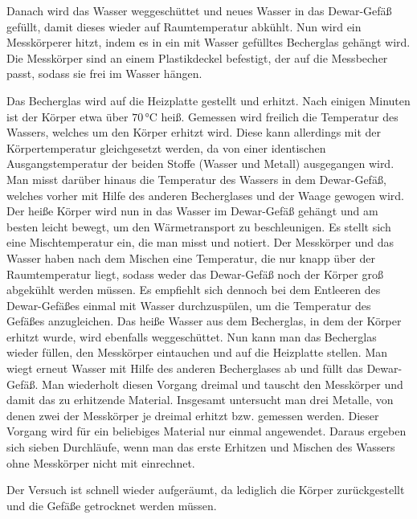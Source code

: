 Danach wird das Wasser weggeschüttet und neues Wasser in das Dewar-Gefäß gefüllt, damit dieses wieder auf Raumtemperatur abkühlt.
Nun wird ein Messkörperer hitzt, indem es in ein mit Wasser gefülltes Becherglas gehängt wird. Die Messkörper sind an einem Plastikdeckel befestigt, der auf %
die Messbecher passt, sodass sie frei im Wasser hängen.

Das Becherglas wird auf die Heizplatte gestellt und erhitzt. 
Nach einigen Minuten ist der Körper etwa über $70 \, \si{\celsius}$ heiß. %
Gemessen wird freilich die Temperatur des Wassers, welches um den Körper erhitzt wird. 
Diese kann allerdings mit der Körpertemperatur gleichgesetzt werden, da von einer identischen Ausgangstemperatur der beiden Stoffe (Wasser und Metall) ausgegangen wird. %
Man misst darüber hinaus die Temperatur des Wassers in dem Dewar-Gefäß, welches vorher mit Hilfe des anderen Becherglases und der Waage gewogen wird. %
Der heiße Körper wird nun in das Wasser im Dewar-Gefäß gehängt und am besten leicht bewegt, um den Wärmetransport zu beschleunigen.
Es stellt sich eine Mischtemperatur ein, die man misst und notiert. Der Messkörper und das Wasser haben nach dem Mischen eine Temperatur, %
die nur knapp über der Raumtemperatur liegt, sodass weder das Dewar-Gefäß noch der Körper groß abgekühlt werden müssen.
Es empfiehlt sich dennoch bei dem Entleeren des Dewar-Gefäßes einmal mit Wasser durchzuspülen, um die Temperatur des Gefäßes anzugleichen.
Das heiße Wasser aus dem Becherglas, in dem der Körper erhitzt wurde, wird ebenfalls weggeschüttet.
Nun kann man das Becherglas wieder füllen, den Messkörper eintauchen und auf die Heizplatte stellen. %
Man wiegt erneut Wasser mit Hilfe des anderen Becherglases ab und füllt das Dewar-Gefäß. %
Man wiederholt diesen Vorgang dreimal und tauscht den Messkörper und damit das zu erhitzende Material. %
Insgesamt untersucht man drei Metalle, von denen zwei der Messkörper je dreimal erhitzt bzw. gemessen werden. Dieser Vorgang wird für ein beliebiges Material nur einmal angewendet. %
Daraus ergeben sich sieben Durchläufe, wenn man das erste Erhitzen und Mischen des Wassers ohne Messkörper nicht mit einrechnet.

Der Versuch ist schnell wieder aufgeräumt, da lediglich die Körper zurückgestellt und die Gefäße getrocknet werden müssen.
\pagebreak